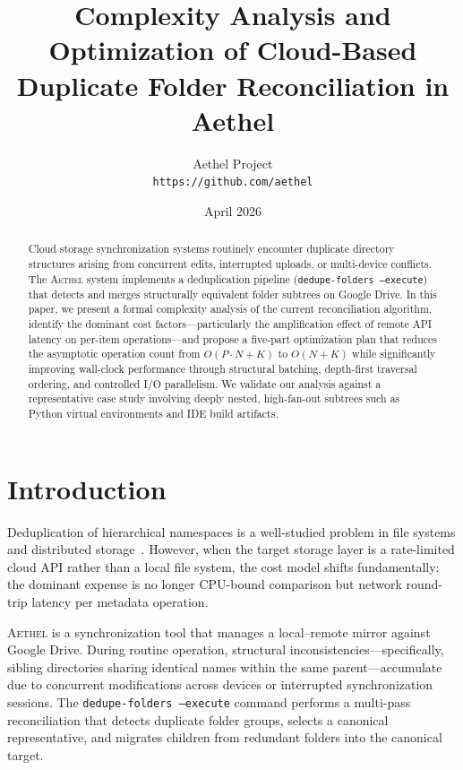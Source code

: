 \documentclass[12pt,a4paper]{article}
\title{Complexity Analysis and Optimization of Cloud-Based\\Duplicate Folder Reconciliation in Aethel}
\author{%
  Aethel Project\\
  \texttt{https://github.com/aethel}
}
\date{April 2026}
\begin{document}
\maketitle

\begin{abstract}
Cloud storage synchronization systems routinely encounter duplicate directory structures arising from concurrent edits, interrupted uploads, or multi-device conflicts. The \textsc{Aethel} system implements a deduplication pipeline (\texttt{dedupe-folders~--execute}) that detects and merges structurally equivalent folder subtrees on Google Drive. In this paper, we present a formal complexity analysis of the current reconciliation algorithm, identify the dominant cost factors---particularly the amplification effect of remote API latency on per-item operations---and propose a five-part optimization plan that reduces the asymptotic operation count from $O(P \cdot N + K)$ to $O(N + K)$ while significantly improving wall-clock performance through structural batching, depth-first traversal ordering, and controlled I/O parallelism. We validate our analysis against a representative case study involving deeply nested, high-fan-out subtrees such as Python virtual environments and IDE build artifacts.
\end{abstract}

\section{Introduction}

Deduplication of hierarchical namespaces is a well-studied problem in file systems and distributed storage~\cite{quinlan2002venti, zhu2008avoiding}. However, when the target storage layer is a rate-limited cloud API rather than a local file system, the cost model shifts fundamentally: the dominant expense is no longer CPU-bound comparison but network round-trip latency per metadata operation.

\textsc{Aethel} is a synchronization tool that manages a local--remote mirror against Google Drive. During routine operation, structural inconsistencies---specifically, sibling directories sharing identical names within the same parent---accumulate due to concurrent modifications across devices or interrupted synchronization sessions. The \texttt{dedupe-folders~--execute} command performs a multi-pass reconciliation that detects duplicate folder groups, selects a canonical representative, and migrates children from redundant folders into the canonical target.
\end{document}
